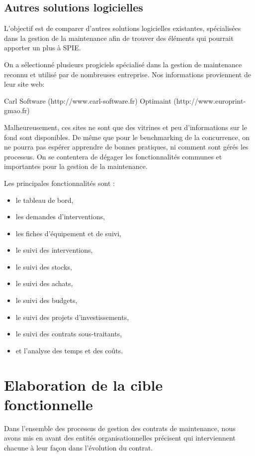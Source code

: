 \subsection{Autres solutions logicielles}

L’objectif est de comparer d’autres solutions logicielles existantes, spécialisées dans la gestion de la maintenance afin de trouver des éléments qui pourrait apporter un plus à SPIE.

On a sélectionné plusieurs progiciels spécialisé dans la gestion de maintenance reconnu et utilisé par de nombreuses entreprise. Nos informations proviennent de leur site web:

Carl Software (http://www.carl-software.fr)
Optimaint (http://www.europrint-gmao.fr)

Malheureusement, ces sites ne sont que des vitrines et peu d’informations sur le fond sont disponibles. De même que pour le benchmarking de la concurrence, on ne pourra pas espérer apprendre de bonnes pratiques, ni comment sont gérés les processus. On se contentera de dégager les fonctionnalités communes et importantes pour la gestion de la maintenance.

Les principales fonctionnalités sont :

\begin{itemize}
\item le tableau de bord,
\item les demandes d’interventions,
\item les fiches d'équipement et de suivi,
\item le suivi des interventions,
\item le suivi des stocks,
\item le suivi des achats,
\item le suivi des budgets,
\item le suivi des projets d’investissements,
\item le suivi des contrats sous-traitants,
\item et l'analyse des temps et des coûts.
\end{itemize}

\section{Elaboration de la cible fonctionnelle}
Dans l'ensemble des processus de gestion des contrats de maintenance, nous avons mis en avant des entités organisationnelles précisent qui interviennent chacune à leur façon dans l'évolution du contrat.

